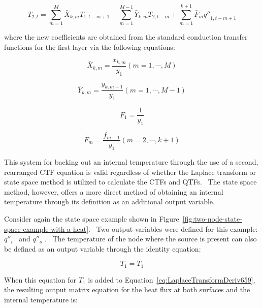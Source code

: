 \begin{equation}
{T_{2,t}} = \sum\limits_{m = 1}^M {{{\bar X}_{k,m}}{T_{1,t - m + 1}}}  - \sum\limits_{m = 1}^{M - 1} {{{\bar Y}_{k,m}}{T_{2,t - m}}}  + \sum\limits_{m = 1}^{k + 1} {{{\bar F}_m}{{q''}_{1,t - m + 1}}}
\end{equation}

where the new coefficients are obtained from the standard conduction transfer functions for the first layer via the following equations:

\begin{equation}
{\bar X_{k,m}} = \frac{{{x_{k,m}}}}{{{y_1}}}\left( {m = 1, \cdots ,M} \right)
\end{equation}

\begin{equation}
{\bar Y_{k,m}} = \frac{{{y_{k,m + 1}}}}{{{y_1}}}\left( {m = 1, \cdots ,M - 1} \right)
\end{equation}

\begin{equation}
{\bar F_1} = \frac{1}{{{y_1}}}
\end{equation}

\begin{equation}
{\bar F_m} = \frac{{{f_{m - 1}}}}{{{y_1}}}\left( {m = 2, \cdots ,k + 1} \right)
\end{equation}

This system for backing out an internal temperature through the use of a second, rearranged CTF equation is valid regardless of whether the Laplace transform or state space method is utilized to calculate the CTFs and QTFs.~ The state space method, however, offers a more direct method of obtaining an internal temperature through its definition as an additional output variable.

Consider again the state space example shown in Figure~\ref{fig:two-node-state-space-example-with-a-heat}.~ Two output variables were defined for this example: \({q''_i}\) ~and \({q''_o}\) .~ The temperature of the node where the source is present can also be defined as an output variable through the identity equation:

\begin{equation}
{T_1} = {T_1}
\end{equation}

When this equation for \(T_1\) is added to Equation~\ref{eq:LaplaceTransformDeriv659}, the resulting output matrix equation for the heat flux at both surfaces and the internal temperature is:

